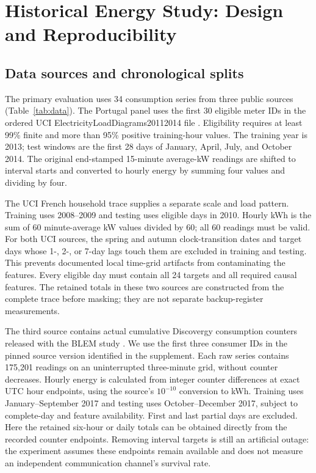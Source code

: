 \documentclass[12pt]{article}
\begin{document}
\FloatBarrier

\section{Historical Energy Study: Design and Reproducibility}\label{app:historical-design}
\subsection{Data sources and chronological splits}
The primary evaluation uses 34 consumption series from three public sources
(Table~\ref{tab:data}). The Portugal panel uses the first 30 eligible meter
IDs in the ordered UCI ElectricityLoadDiagrams20112014 file \cite{portugal}.
Eligibility requires at least 99\% finite and more than 95\% positive
training-hour values. The training year is 2013; test windows are the first
28 days of January, April, July, and October 2014. The original end-stamped
15-minute average-kW readings are shifted to interval starts and converted
to hourly energy by summing four values and dividing by four.

The UCI French household trace \cite{uci} supplies a separate scale and
load pattern. Training uses 2008--2009 and testing uses eligible days in
2010. Hourly kWh is the sum of 60 minute-average kW values divided by 60;
all 60 readings must be valid. For both UCI sources, the spring and autumn
clock-transition dates and target days whose 1-, 2-, or 7-day lags touch
them are excluded in training and testing. This prevents documented local
time-grid artifacts from contaminating the features. Every eligible day
must contain all 24 targets and all required causal features. The retained
totals in these two sources are constructed from the complete trace before
masking; they are not separate backup-register measurements.

The third source contains actual cumulative Discovergy consumption counters
released with the BLEM study \cite{blem}. We use the first three consumer
IDs in the pinned source version identified in the supplement. Each raw
series contains 175,201 readings on an uninterrupted three-minute grid,
without counter decreases. Hourly energy is calculated from integer
counter differences at exact UTC hour endpoints, using the source's
$10^{-10}$ conversion to kWh. Training uses January--September 2017 and
testing uses October--December 2017, subject to complete-day and feature
availability. First and last partial days are excluded. Here the retained
six-hour or daily totals can be obtained directly from the recorded
counter endpoints. Removing interval targets is still an artificial outage:
the experiment assumes these endpoints remain available and does not
measure an independent communication channel's survival rate.
\end{document}

